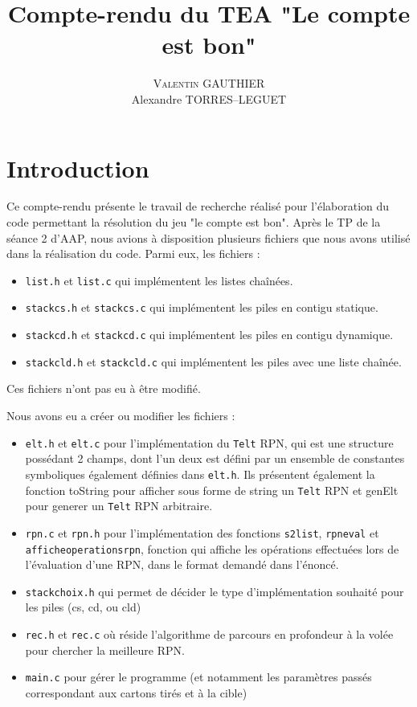 \documentclass[11pt]{article}
\title{Compte-rendu du TEA "Le compte est bon"}
\author{\textsc{Valentin GAUTHIER}\\ Alexandre TORRES--LEGUET}
\begin{document}
\maketitle

\section{Introduction}

\quad \quad Ce compte-rendu présente le travail de recherche réalisé pour l’élaboration du code permettant la résolution du jeu "le compte est bon". Après le TP de la séance 2 d’AAP, nous avions à disposition plusieurs fichiers que nous avons  utilisé dans la réalisation du code. Parmi eux, les fichiers :

\begin{itemize}
\item \texttt{list.h} et \texttt{list.c} qui implémentent les listes chaînées.
\item \texttt{stack\textunderscore cs.h} et \texttt{stack\textunderscore cs.c} qui implémentent les piles en contigu statique.
\item \texttt{stack\textunderscore cd.h} et \texttt{stack\textunderscore cd.c} qui implémentent les piles en contigu dynamique.
\item \texttt{stack\textunderscore cld.h} et \texttt{stack\textunderscore cld.c} qui implémentent les piles avec une liste chaînée.
\end{itemize}

Ces fichiers n’ont pas eu à être modifié. 

Nous avons eu a créer ou modifier les fichiers :

\begin{itemize}
\item \texttt{elt.h} et \texttt{elt.c} pour l'implémentation du \texttt{T\textunderscore elt} RPN, qui est une structure possédant 2 champs, dont l'un deux est défini par un ensemble de constantes symboliques également définies dans \texttt{elt.h}. Ils présentent également la fonction toString pour afficher sous forme de string un \texttt{T\textunderscore elt} RPN et genElt pour generer un \texttt{T\textunderscore elt} RPN arbitraire.
\item \texttt{rpn.c} et \texttt{rpn.h} pour l'implémentation des fonctions \texttt{s2list}, \texttt{rpn\textunderscore eval} et \texttt{affiche\textunderscore operations\textunderscore rpn}, fonction qui affiche les opérations effectuées lors de l'évaluation d'une RPN, dans le format demandé dans l'énoncé. 
\item \texttt{stack\textunderscore choix.h} qui permet de décider le type d’implémentation souhaité pour les piles (cs, cd, ou cld)
\item \texttt{rec.h} et \texttt{rec.c} où réside l'algorithme de parcours en profondeur à la volée pour chercher la meilleure RPN.
\item \texttt{main.c} pour gérer le programme (et notamment les paramètres passés correspondant aux cartons tirés et à la cible)
\end{itemize}
\end{document}

